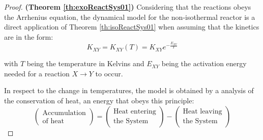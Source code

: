 \documentclass[a4paper,11pt]{book}
\numberwithin{figure}{chapter}
\numberwithin{equation}{chapter}
\numberwithin{table}{chapter}
\theoremstyle{definition}
\begin{document}
\begin{proof}{\textbf{(Theorem \ref{th:exoReactSys01})}}
    Considering that the reactions obeys the Arrhenius equation, the dynamical model for the non-isothermal reactor is a direct application of Theorem \ref{th:isoReactSys01} when assuming that the kinetics are in the form:
    \begin{equation}
    	K_{XY} = K_{XY}(T) = K_{XY} e^{-\frac{E_{XY}}{T}} 
    \end{equation}
    
    \noindent with $T$ being the temperature in Kelvins and $E_{XY}$ being the activation energy needed for a reaction $X \rightarrow Y$ to occur.

	In respect to the change in temperatures, the model is obtained by a analysis of the conservation of heat, an energy that obeys this principle: 
	\begin{equation} \label{eq:jacket01}
		\begin{pmatrix}
			\text{Accumulation} \\ \text{of heat}
		\end{pmatrix} = \begin{pmatrix}
			\text{Heat entering} \\ \text{the System}
		\end{pmatrix} - \begin{pmatrix}
			\text{Heat leaving} \\ \text{the System}
		\end{pmatrix}
	\end{equation}
	

\end{proof}
\end{document}
